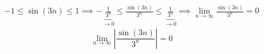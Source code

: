 \documentclass[../rgr_2.tex]{subfiles}
\begin{document}
\Solution

\begin{equation}
	\begin{aligned}
	-1\leq \sin(3n) \leq 1 \implies
	-\underbrace{\frac{1}{3^n}}_{\to0}\leq \frac{\sin(3n)}{3^n} \leq \underbrace{\frac{1}{3^n}}_{\to0} \implies
	\lim_{n\to\infty}\frac{\sin(3n)}{3^n} = 0
	\end{aligned}
\end{equation}
\begin{equation}
	\lim_{n\to\infty}\left|\frac{\sin(3n)}{3^n}\right| = 0
\end{equation}

\end{document}
